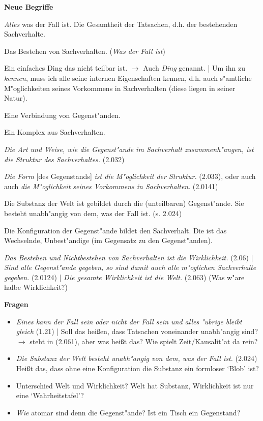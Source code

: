 \documentclass[]{scrartcl}
\begin{document}
\vspace{10pt}
\textbf{Neue Begriffe}

\begin{description}[leftmargin=!,labelwidth=\widthof{\bfseries Konfiguration}]
  \item[Welt] \emph{Alles} was der Fall ist. Die Gesamtheit der Tatsachen, d.h. der bestehenden Sachverhalte.
  \item[Tatsache] Das Bestehen von Sachverhalten. (\emph{Was der Fall ist})
  \item[Gegenstand] Ein einfaches Ding das nicht teilbar ist. $\rightarrow$ Auch \emph{Ding} genannt. | Um ihn zu \emph{kennen}, muss ich alle seine internen Eigenschaften kennen, d.h. auch s"amtliche M"oglichkeiten seines Vorkommens in Sachverhalten (diese liegen in seiner Natur).
  \item[Sachverhalt] Eine Verbindung von Gegenst"anden.
  \item[Sachlage] Ein Komplex aus Sachverhalten.
  \item[Struktur] \emph{Die Art und Weise, wie die Gegenst"ande im Sachverhalt zusammenh"angen, ist die Struktur des Sachverhaltes.} (2.032)
  \item[Form] \emph{Die Form} [des Gegenstands] \emph{ist die M"oglichkeit der Struktur.} (2.033), oder auch auch \emph{die M"oglichkeit seines Vorkommens in Sachverhalten}. (2.0141)
  \item[Substanz] Die Substanz der Welt ist gebildet durch die (unteilbaren) Gegenst"ande. Sie besteht unabh"angig von dem, was der Fall ist. (s. 2.024)
  \item[Konfiguration] Die Konfiguration der Gegenst"ande bildet den Sachverhalt. Die ist das Wechselnde, Unbest"andige (im Gegensatz zu den Gegenst"anden).
  \item[Wirklichkeit] \emph{Das Bestehen und Nichtbestehen von Sachverhalten ist die Wirklichkeit.} (2.06) | \emph{Sind alle Gegenst"ande gegeben, so sind damit auch alle m"oglichen Sachverhalte gegeben.} (2.0124) | \emph{Die gesamte Wirklichkeit ist die Welt.} (2.063) {\color{red}(Was w"are halbe Wirklichkeit?)}
\end{description}

\textbf{Fragen}

\begin{itemize}
  \item \emph{Eines kann der Fall sein oder nicht der Fall sein und alles "ubrige bleibt gleich} (1.21) | Soll das hei\ss en, dass Tatsachen voneinander unabh"angig sind? $\rightarrow$ steht in (2.061), aber was hei\ss t das? Wie spielt Zeit/Kausalit"at da rein?
  \item \emph{Die Substanz der Welt besteht unabh"angig von dem, was der Fall ist.} (2.024) Hei\ss t das, dass ohne eine Konfiguration die Substanz ein formloser `Blob' ist?
  \item Unterschied Welt und Wirklichkeit? Welt hat Substanz, Wirklichkeit ist nur eine `Wahrheitstafel'? 
  \item \emph{Wie} atomar sind denn die Gegenst"ande? Ist ein Tisch ein Gegenstand?
\end{itemize}
\end{document}
